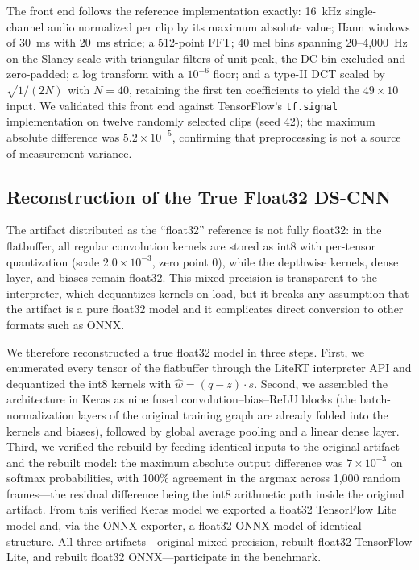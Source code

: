 \documentclass[conference,a4paper]{IEEEtran}
\begin{document}
The front end follows the reference implementation exactly: 16~kHz single-channel audio normalized per clip by its maximum absolute value; Hann windows of 30~ms with 20~ms stride; a 512-point FFT; 40 mel bins spanning 20--4{,}000~Hz on the Slaney scale with triangular filters of unit peak, the DC bin excluded and zero-padded; a log transform with a $10^{-6}$ floor; and a type-II DCT scaled by $\sqrt{1/(2N)}$ with $N=40$, retaining the first ten coefficients to yield the $49\times10$ input. We validated this front end against TensorFlow's \texttt{tf.signal} implementation on twelve randomly selected clips (seed 42); the maximum absolute difference was $5.2\times10^{-5}$, confirming that preprocessing is not a source of measurement variance.

\subsection{Reconstruction of the True Float32 DS-CNN}

The artifact distributed as the ``float32'' reference is not fully float32: in the flatbuffer, all regular convolution kernels are stored as int8 with per-tensor quantization (scale $2.0\times10^{-3}$, zero point 0), while the depthwise kernels, dense layer, and biases remain float32. This mixed precision is transparent to the interpreter, which dequantizes kernels on load, but it breaks any assumption that the artifact is a pure float32 model and it complicates direct conversion to other formats such as ONNX.

We therefore reconstructed a true float32 model in three steps. First, we enumerated every tensor of the flatbuffer through the LiteRT interpreter API and dequantized the int8 kernels with $\hat{w} = (q - z) \cdot s$. Second, we assembled the architecture in Keras as nine fused convolution--bias--ReLU blocks (the batch-normalization layers of the original training graph are already folded into the kernels and biases), followed by global average pooling and a linear dense layer. Third, we verified the rebuild by feeding identical inputs to the original artifact and the rebuilt model: the maximum absolute output difference was $7\times10^{-3}$ on softmax probabilities, with 100\% agreement in the argmax across 1{,}000 random frames---the residual difference being the int8 arithmetic path inside the original artifact. From this verified Keras model we exported a float32 TensorFlow Lite model and, via the ONNX exporter, a float32 ONNX model of identical structure. All three artifacts---original mixed precision, rebuilt float32 TensorFlow Lite, and rebuilt float32 ONNX---participate in the benchmark.
\end{document}
